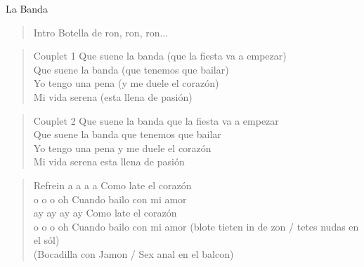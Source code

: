 
\begin{song}[takirari]{La Banda}
\begin{verse}{Intro}
Botella de ron, ron, ron...
\end{verse}

\begin{verse}{Couplet 1}
Que suene la banda (que la fiesta va a empezar) \\
Que suene la banda (que tenemos que bailar)\\
Yo tengo una pena (y me duele el corazón)\\
Mi vida serena (esta llena de pasión)
\end{verse}

\begin{verse}{Couplet 2}
Que suene la banda \hspace{2em} que la fiesta va a empezar \\
Que suene la banda  \hspace{2em}que tenemos que bailar\\
Yo tengo una pena  \hspace{2em}y me duele el corazón\\
Mi vida serena  \hspace{2em}esta llena de pasión
\end{verse}

\begin{verse}{Refrein}
a a a a \hspace{4em} Como late el corazón\\
o o o oh \hspace{4em} Cuando bailo con mi amor\\
\chord{}ay ay ay ay \hspace{2.7em} Como late el corazón\\
o o o oh \hspace{4em} Cuando bailo con mi amor (blote tieten in de zon / tetes nudas en el sól)\\
\hspace{20em} (Bocadilla con Jamon / Sex anal en el balcon)
\end{verse}


\end{song}
